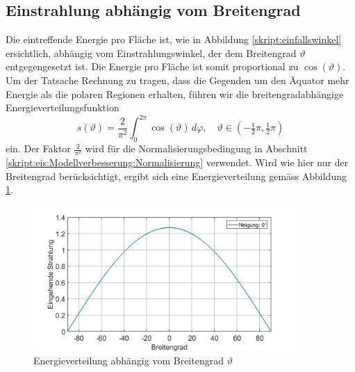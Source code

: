 \begin{refsection}
\subsection{Einstrahlung abhängig vom Breitengrad}
Die eintreffende Energie pro Fläche ist, wie in Abbildung \ref{skript:einfallswinkel} ersichtlich, abhängig vom Einstrahlungswinkel, der dem Breitengrad $\vartheta$ entgegengesetzt ist. Die Energie pro Fläche ist somit proportional zu $\cos(\vartheta)$. Um der Tatsache Rechnung zu tragen, dass die Gegenden um den Äquator mehr Energie als die polaren Regionen erhalten, führen wir die breitengradabhängige Energieverteilungsfunktion
\begin{equation}\label{skript:eis:Energieverteilung Breitengrad}
s(\vartheta)
=
\frac{2}{\pi^2}\int_{0}^{2\pi}\cos(\vartheta)\,d\varphi,\quad
\vartheta\in(-\tfrac{1}{2}\pi,\tfrac{1}{2}\pi)
\end{equation}
ein. Der Faktor $\frac{2}{\pi^2}$ wird für die Normalisierungsbedingung in Abschnitt \ref{skript:eis:Modellverbesserung:Normalisierung} verwendet. Wird wie hier nur der Breitengrad berücksichtigt, ergibt sich eine Energieverteilung gemäss Abbildung \ref{skript:eis:fig:Einstrahlung_abh_vom_Breitengrad}.
\begin{figure}
 	\centering
 	\includegraphics[width=10cm]{eis/Einstrahlung_abh_vom_Breitengrad.jpg}
 	\caption{Energieverteilung abhängig vom Breitengrad $\vartheta$}
 	\label{skript:eis:fig:Einstrahlung_abh_vom_Breitengrad}
\end{figure}

\end{refsection}
